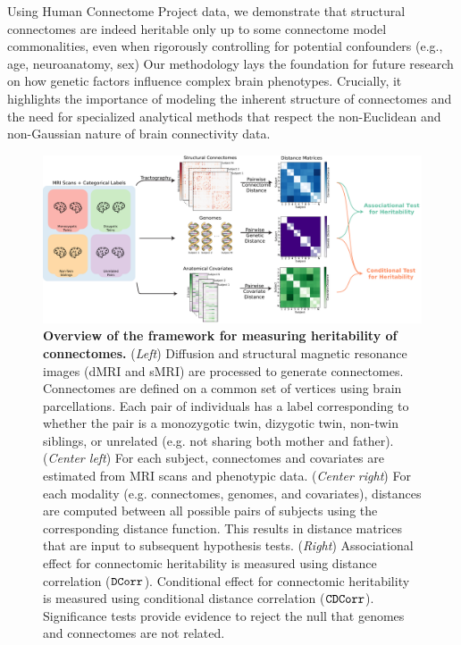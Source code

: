 Using Human Connectome Project data, we demonstrate that structural connectomes are indeed heritable only up to some connectome model commonalities, even when rigorously controlling for potential confounders (e.g., age, neuroanatomy, sex) 
Our methodology lays the foundation for future research on how genetic factors influence complex brain phenotypes. Crucially, it highlights the importance of modeling the inherent structure of connectomes and the need for specialized analytical methods that respect the non-Euclidean and non-Gaussian nature of brain connectivity data.

\begin{figure}%
  \centering
  \includegraphics[width=1\linewidth]{figures/herit/framework.pdf}
  \caption{
  \textbf{Overview of the framework for measuring heritability of connectomes.} (\textit{Left}) Diffusion and structural magnetic resonance images (dMRI and sMRI) are processed to generate connectomes. Connectomes are defined on a common set of vertices using brain parcellations. Each pair of individuals has a label corresponding to whether the pair is a monozygotic twin, dizygotic twin, non-twin siblings, or unrelated (e.g. not sharing both mother and father).
  (\textit{Center left}) For each subject, connectomes and covariates are estimated from MRI scans and phenotypic data.
  (\textit{Center right}) For each modality (e.g. connectomes, genomes, and covariates), distances are computed between all possible pairs of subjects using the corresponding distance function. This results in distance matrices that are input to subsequent hypothesis tests.
  (\textit{Right}) Associational effect for connectomic heritability is measured using distance correlation ($\operatorname{\mathtt{DCorr}}$). Conditional effect for connectomic heritability is measured using conditional distance correlation ($\operatorname{\mathtt{CDCorr}}$). Significance tests provide evidence to reject the null that genomes and connectomes are not related.}
\label{fig:framework}
\end{figure}
